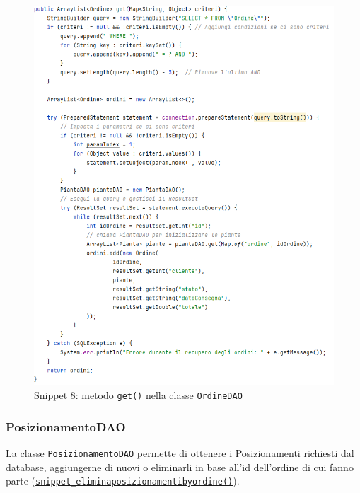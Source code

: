 \documentclass{article}
\newcommand{\code}[1]{\texttt{#1}}
\begin{document}
\begin{figure}[H]
    \centering
    \includegraphics[scale=0.5]{resources/images/Snippets/snippet_OrdineDAOget.png}
    \captionsetup{labelformat=empty,labelsep=none}
    \caption{Snippet 8: metodo \code{get()} nella classe \code{OrdineDAO}}
    \label{fig:snippet_OrdineDAOget}
\end{figure}

\newpage

\subsubsection{PosizionamentoDAO}
La classe \code{PosizionamentoDAO} permette di ottenere i Posizionamenti richiesti dal database, aggiungerne di nuovi o eliminarli in base all'id dell'ordine di cui fanno parte (\hyperref[fig:snippet_eliminaposizionamentibyordine]{\code{snippet\_eliminaposizionamentibyordine()}}).
\end{document}
